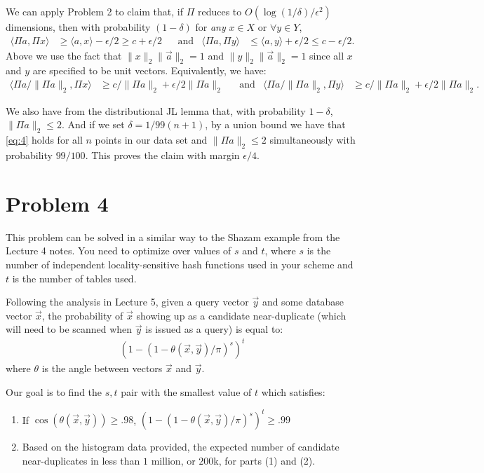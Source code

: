 \documentclass[11pt]{article}
\newcommand{\bv}[1]{\vec{#1}}
\begin{document}
	We can apply Problem 2 to claim that, if $\Pi$ reduces to $O(\log(1/\delta)/\epsilon^2)$ dimensions, then with probability $(1-\delta)$ for \emph{any} $x \in X$ or $\forall y \in Y$,
	\begin{align*}
	\langle \Pi a, \Pi x \rangle &\geq \langle a, x \rangle - \epsilon/2 \geq c + \epsilon/2 & &\text{and} & \langle \Pi a, \Pi y \rangle &\leq \langle a, y \rangle + \epsilon/2 \leq c - \epsilon/2.
	\end{align*}
	Above we use the fact that $\|x\|_2\|\bv{a}\|_2 = 1$ and $\|y\|_2\|\bv{a}\|_2 = 1$ since all $x$ and $y$ are specified to be unit vectors. Equivalently, we have:
	\begin{align}
	\label{eq:4}
	\langle \Pi a/\|\Pi a\|_2, \Pi x \rangle &\geq c/\|\Pi a\|_2 + \epsilon/2\|\Pi a\|_2 & &\text{and} & \langle \Pi a/\|\Pi a\|_2, \Pi y \rangle &\geq c/\|\Pi a\|_2 + \epsilon/2\|\Pi a\|_2.
	\end{align}
	
	
	We also have from the distributional JL lemma that, with probability $1 - \delta$, $\|\Pi a\|_2 \leq 2$. And if we set $\delta = 1/99(n+1)$, by a union bound we have that \eqref{eq:4} holds for all $n$ points in our data set and $\|\Pi a\|_2 \leq 2$ simultaneously with probability $99/100$. This proves the claim with margin $\epsilon/4$. 
	
	\section*{Problem 4}
	This problem can be solved in a similar way to the Shazam example from the Lecture 4 notes. You need to optimize over values of $s$ and $t$, where $s$ is the number of independent locality-sensitive hash functions used in your scheme and $t$ is the number of tables used. 
	
	
	Following the analysis in Lecture 5, given a query vector $\bv{y}$ and some database vector $\bv{x}$, the probability of $\bv{x}$ showing up as a candidate near-duplicate (which will need to be scanned when $\bv{y}$ is issued as a query) is equal to:
	\begin{align}
		(1 - (1 - \theta(\bv{x},\bv{y})/\pi)^s)^t
	\end{align}
	where $\theta$ is the angle between vectors $\bv{x}$ and $\bv{y}$. 
	
	Our goal is to find the $s,t$ pair with the smallest value of $t$ which satisfies:
	\begin{enumerate}
		\item If $\cos(\theta(\bv{x},\bv{y})) \geq .98$, $(1 - (1 - \theta(\bv{x},\bv{y})/\pi)^s)^t \geq .99$
		\item Based on the histogram data provided, the expected number of candidate near-duplicates in less than $1$ million, or $200$k, for parts (1) and (2).
	\end{enumerate}
	
\end{document}
